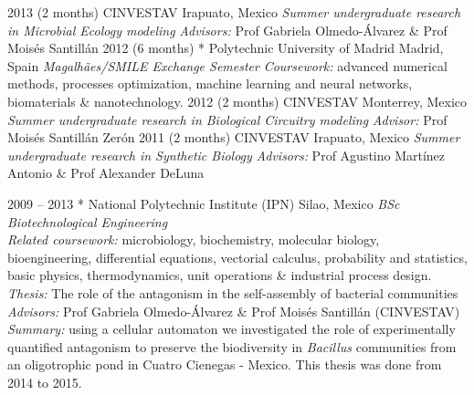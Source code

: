 \documentclass[]{friggeri-cv} %
\begin{document}
\begin{entrylist}
\entry
{2013}
{(2 months)}
{CINVESTAV}
{Irapuato, Mexico}
{{\normalsize\emph{Summer undergraduate research in Microbial Ecology modeling}}}
{\emph{Advisors:} Prof Gabriela Olmedo-Álvarez \& Prof Moisés Santillán }%
\entry
{2012}
{(6 months)}
{* Polytechnic University of Madrid}
{Madrid, Spain}
{{\normalsize\emph{Magalhães/SMILE Exchange Semester}}}
{\emph{Coursework:} advanced numerical methods, processes optimization, machine learning and neural networks, biomaterials \& nanotechnology.}
\entry
{2012}
{(2 months)}
{CINVESTAV}
{Monterrey, Mexico}
{{\normalsize\emph{Summer undergraduate research in Biological Circuitry modeling}}}
{\emph{Advisor:} Prof Moisés Santillán Zerón }%
\entry
{2011}
{(2 months)}
{CINVESTAV}
{Irapuato, Mexico}
{{\normalsize\emph{Summer undergraduate research in Synthetic Biology}}}
{\emph{Advisors:} Prof Agustino Martínez Antonio \& Prof Alexander DeLuna}%
\end{entrylist}
\begin{entrylist}
\entry
{2009 -- 2013}
{}
{* National Polytechnic Institute (IPN)}
{Silao, Mexico}
{{\normalsize\emph{BSc {\normalfont Biotechnological Engineering}} \\} \emph{Related coursework:} microbiology, biochemistry, molecular biology, bioengineering, differential equations, vectorial calculus, probability and statistics, basic physics, thermodynamics, unit operations \& industrial process design.}
{\emph{Thesis:} The role of the antagonism in the self-assembly of bacterial communities \\ \emph{Advisors:} Prof Gabriela Olmedo-Álvarez \& Prof Moisés Santillán (CINVESTAV) \\ \emph{Summary:} using a cellular automaton we investigated the role of experimentally quantified antagonism to preserve the biodiversity in \textit{Bacillus} communities from an oligotrophic pond in Cuatro Cienegas - Mexico. This thesis was done from 2014 to 2015.}
\end{entrylist}
\end{document}
